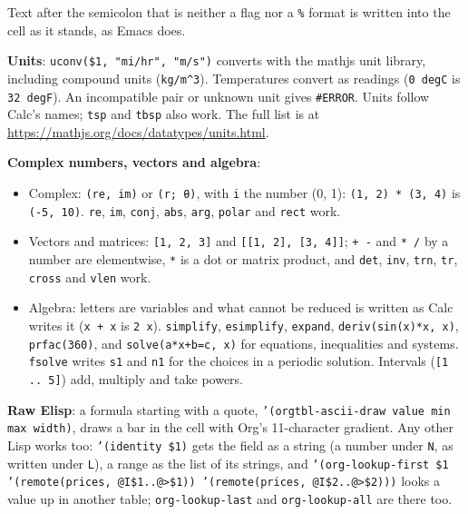 \documentclass[11pt]{article}
\begin{document}
Text after the semicolon that is neither a flag nor a \texttt{\%} format is written into the cell as it stands, as Emacs does.

\textbf{Units}: \texttt{uconv(\$1, "mi/hr", "m/s")} converts with the mathjs unit library, including compound units (\texttt{kg/m\textasciicircum{}3}). Temperatures convert as readings (\texttt{0 degC} is \texttt{32 degF}). An incompatible pair or unknown unit gives \texttt{\#ERROR}. Units follow Calc's names; \texttt{tsp} and \texttt{tbsp} also work. The full list is at \url{https://mathjs.org/docs/datatypes/units.html}.

\textbf{Complex numbers, vectors and algebra}:
\begin{itemize}
\item Complex: \texttt{(re, im)} or \texttt{(r; θ)}, with \texttt{i} the number (0, 1): \texttt{(1, 2) * (3, 4)} is \texttt{(-5, 10)}. \texttt{re}, \texttt{im}, \texttt{conj}, \texttt{abs}, \texttt{arg}, \texttt{polar} and \texttt{rect} work.
\item Vectors and matrices: \texttt{[1, 2, 3]} and \texttt{[[1, 2], [3, 4]]}; \texttt{+ -} and \texttt{* /} by a number are elementwise, \texttt{*} is a dot or matrix product, and \texttt{det}, \texttt{inv}, \texttt{trn}, \texttt{tr}, \texttt{cross} and \texttt{vlen} work.
\item Algebra: letters are variables and what cannot be reduced is written as Calc writes it (\texttt{x + x} is \texttt{2 x}). \texttt{simplify}, \texttt{esimplify}, \texttt{expand}, \texttt{deriv(sin(x)*x, x)}, \texttt{prfac(360)}, and \texttt{solve(a*x+b=c, x)} for equations, inequalities and systems. \texttt{fsolve} writes \texttt{s1} and \texttt{n1} for the choices in a periodic solution. Intervals (\texttt{[1 .. 5]}) add, multiply and take powers.
\end{itemize}

\textbf{Raw Elisp}: a formula starting with a quote, \texttt{'(orgtbl-ascii-draw value min max width)}, draws a bar in the cell with Org's 11-character gradient. Any other Lisp works too: \texttt{'(identity \$1)} gets the field as a string (a number under \texttt{N}, as written under \texttt{L}), a range as the list of its strings, and \texttt{'(org-lookup-first \$1 '(remote(prices, @I\$1..@>\$1)) '(remote(prices, @I\$2..@>\$2)))} looks a value up in another table; \texttt{org-lookup-last} and \texttt{org-lookup-all} are there too.
\end{document}
